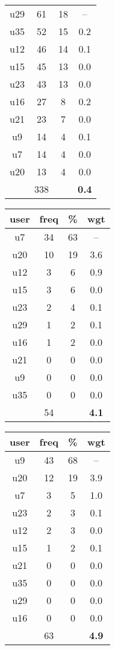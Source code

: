 \begin{appendices}
\begin{table}
\begin{tabular}{ |c|c|c|c| }
	u29 & 61 & 18 & -- \\
	u35 & 52 & 15 & 0.2 \\
	u12 & 46 & 14 & 0.1 \\
	u15 & 45 & 13 & 0.0 \\
	u23 & 43 & 13 & 0.0 \\
	u16 & 27 & 8 & 0.2 \\
	u21 & 23 & 7 & 0.0 \\
	u9 & 14 & 4 & 0.1 \\
	u7 & 14 & 4 & 0.0 \\
	u20 & 13 & 4 & 0.0 \\
	 & 338 & & \textbf{0.4} \\
	\hline
\end{tabular}
\begin{tabular}{ |c|c|c|c| }
	\hline
	\textbf{user} & \textbf{freq} & \textbf{\%} & \textbf{wgt} \\
	\hline
	u7 & 34 & 63 & -- \\
	u20 & 10 & 19 & 3.6 \\
	u12 & 3 & 6 & 0.9 \\
	u15 & 3 & 6 & 0.0 \\
	u23 & 2 & 4 & 0.1 \\
	u29 & 1 & 2 & 0.1 \\
	u16 & 1 & 2 & 0.0 \\
	u21 & 0 & 0 & 0.0 \\
	u9 & 0 & 0 & 0.0 \\
	u35 & 0 & 0 & 0.0 \\
	 & 54 & & \textbf{4.1} \\
	\hline
\end{tabular}
\begin{tabular}{ |c|c|c|c| }
	\hline
	\textbf{user} & \textbf{freq} & \textbf{\%} & \textbf{wgt} \\
	\hline
	u9 & 43 & 68 & -- \\
	u20 & 12 & 19 & 3.9 \\
	u7 & 3 & 5 & 1.0 \\
	u23 & 2 & 3 & 0.1 \\
	u12 & 2 & 3 & 0.0 \\
	u15 & 1 & 2 & 0.1 \\
	u21 & 0 & 0 & 0.0 \\
	u35 & 0 & 0 & 0.0 \\
	u29 & 0 & 0 & 0.0 \\
	u16 & 0 & 0 & 0.0 \\
	 & 63 & & \textbf{4.9} \\

\end{tabular}
\end{table}
\end{appendices}

